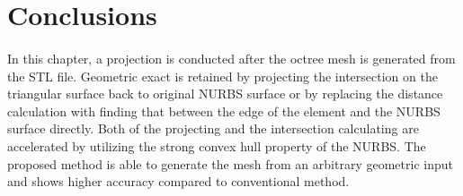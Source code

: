 \section{Conclusions}
\paragraph{}
In this chapter, a projection is conducted after the octree mesh is generated from the STL file.
Geometric exact is retained by projecting the intersection on the triangular surface back to original NURBS surface or by replacing the distance calculation with finding that between the edge of the element and the NURBS surface directly. 
Both of the projecting and the intersection calculating are accelerated by utilizing the strong convex hull property of the NURBS.
The proposed method is able to generate the mesh from an arbitrary geometric input and shows higher accuracy compared to conventional method.
